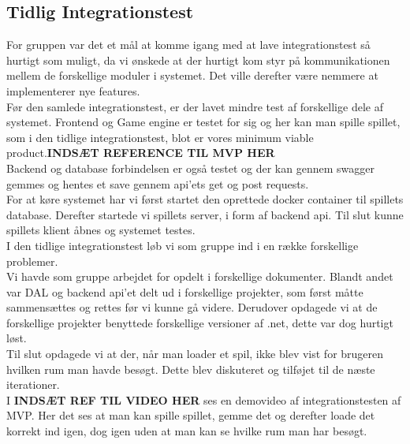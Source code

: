 \subsection{Tidlig Integrationstest}
For gruppen var det et mål at komme igang med at lave integrationstest så hurtigt som muligt, da vi ønskede at der hurtigt kom styr på kommunikationen mellem de forskellige moduler i systemet. Det ville derefter være nemmere at implementerer nye features.\\

Før den samlede integrationstest, er der lavet mindre test af forskellige dele af systemet.
Frontend og Game engine er testet for sig og her kan man spille spillet, som i den tidlige integrationstest, blot er vores minimum viable product.\textbf{INDSÆT REFERENCE TIL MVP HER}\\

Backend og database forbindelsen er også testet og der kan gennem swagger gemmes og hentes et save gennem api'ets get og post requests.\\

For at køre systemet har vi først startet den oprettede docker container til spillets database. Derefter startede vi spillets server, i form af backend api. Til slut kunne spillets klient åbnes og systemet testes.\\

I den tidlige integrationstest løb vi som gruppe ind i en række forskellige problemer.\\
Vi havde som gruppe arbejdet for opdelt i forskellige dokumenter. Blandt andet var DAL og backend api'et delt ud i forskellige projekter, som først måtte sammensættes og rettes før vi kunne gå videre.
Derudover opdagede vi at de forskellige projekter benyttede forskellige versioner af .net, dette var dog hurtigt løst.\\
Til slut opdagede vi at der, når man loader et spil, ikke blev vist for brugeren hvilken rum man havde besøgt. Dette blev diskuteret og tilføjet til de næste iterationer.\\

I \textbf{INDSÆT REF TIL VIDEO HER} ses en demovideo af integrationstesten af MVP. Her det ses at man kan spille spillet, gemme det og derefter loade det korrekt ind igen, dog igen uden at man kan se hvilke rum man har besøgt.
